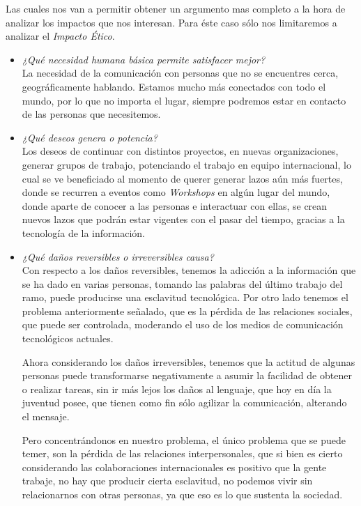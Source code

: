 Las cuales nos van a permitir obtener un argumento mas completo a la hora de analizar los impactos que nos interesan.
Para éste caso sólo nos limitaremos a analizar el \emph{Impacto Ético}.

\begin{itemize}
	\item \emph{¿Qué necesidad humana básica permite satisfacer mejor?}\\
		La necesidad de la comunicación con personas que no se encuentres cerca, geográficamente hablando.
		Estamos mucho más conectados con todo el mundo, por lo que no importa el lugar, siempre podremos
		estar en contacto de las personas que necesitemos.

	\item \emph{¿Qué deseos genera o potencia?}\\
		Los deseos de continuar con distintos proyectos, en nuevas organizaciones, generar grupos de trabajo,
		potenciando el trabajo en equipo internacional, lo cual se ve beneficiado al momento de querer
		generar lazos aún más fuertes, donde se recurren a eventos como \emph{Workshops} en algún lugar del mundo,
		donde aparte de conocer a las personas e interactuar con ellas, se crean nuevos lazos que podrán estar
		vigentes con el pasar del tiempo, gracias a la tecnología de la información.

	\item \emph{¿Qué daños reversibles o irreversibles causa?}\\
		Con respecto a los daños reversibles, tenemos la adicción a la información que se ha dado en varias personas,
		tomando las palabras del último trabajo del ramo, puede producirse una esclavitud tecnológica.
		Por otro lado tenemos el problema anteriormente señalado, que es la pérdida de las relaciones sociales,
		que puede ser controlada, moderando el uso de los medios de comunicación tecnológicos actuales.

		Ahora considerando los daños irreversibles, tenemos que la actitud de algunas personas puede transformarse
		negativamente a asumir la facilidad de obtener o realizar tareas, sin ir más lejos los daños al lenguaje,
		que hoy en día la juventud posee, que tienen como fin sólo agilizar la comunicación, alterando el mensaje.
		
		Pero concentrándonos en nuestro problema, el único problema que se puede temer,
		son la pérdida de las relaciones interpersonales, que si bien es cierto considerando las colaboraciones
		internacionales es positivo que la gente trabaje, no hay que producir cierta esclavitud, no podemos vivir
		sin relacionarnos con otras personas, ya que eso es lo que sustenta la sociedad.


\end{itemize}
